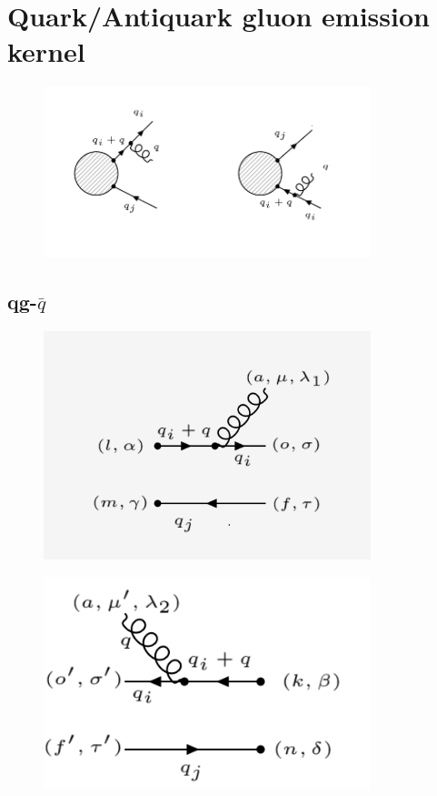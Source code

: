 \section{Quark/Antiquark gluon emission kernel}


\begin{figure}[ht!]
\centering
\includegraphics[width=0.85\textwidth]{images/qqg-diagrams.png}
\end{figure}

\subsection{qg-$\bar{q}$}

\begin{figure}[h!]
\centering
\includegraphics[width=0.85\textwidth]{images/qgqbarM.png}
\end{figure}


\begin{figure}[h!]
\centering
\includegraphics[width=0.85\textwidth]{images/qgqbarMDega.png}
\end{figure}


